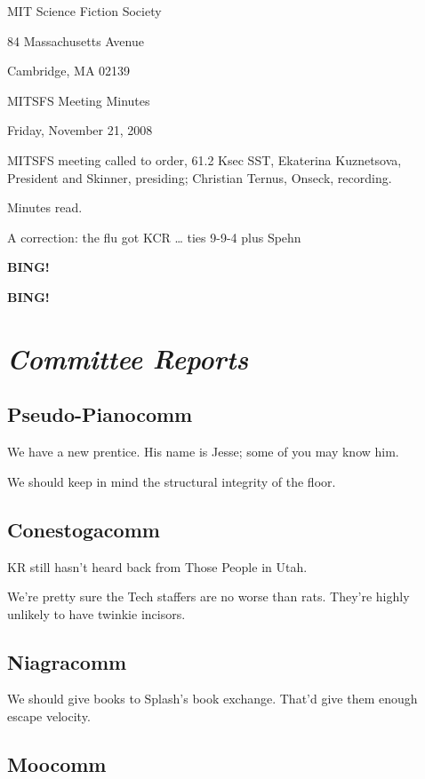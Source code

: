 \documentclass[10pt]{article}
\newcommand{\bing}{{\bf BING!} }
\newcommand{\goto}[1]{\bing \vskip 12pt \section*{{\em{#1}}}}
\newcommand{\ps}{ plus Spehn\xspace}
\begin{document}
\begin{center}

MIT Science Fiction Society

84 Massachusetts Avenue

Cambridge, MA 02139

\vspace{12pt}

MITSFS Meeting Minutes

Friday, November 21, 2008

\end{center}

\vspace{18pt}

\setlength{\parskip}{6pt}

\noindent
MITSFS meeting called to order, 61.2 Ksec SST,
Ekaterina Kuznetsova, President and Skinner, presiding; Christian Ternus, Onseck, recording.

Minutes read.

A correction: the flu got KCR \ldots{} ties 9-9-4\ps

\bing

\goto{Committee Reports}

\subsection*{Pseudo-Pianocomm}

We have a new prentice.  His name is Jesse; some of you may know him.

We should keep in mind the structural integrity of the floor.

\subsection*{Conestogacomm}

KR still hasn't heard back from Those People in Utah.

We're pretty sure the Tech staffers are no worse than rats.  They're
highly unlikely to have twinkie incisors.

\subsection*{Niagracomm}

We should give books to Splash's book exchange.  That'd give them
enough escape velocity.

\subsection*{Moocomm}
\end{document}
